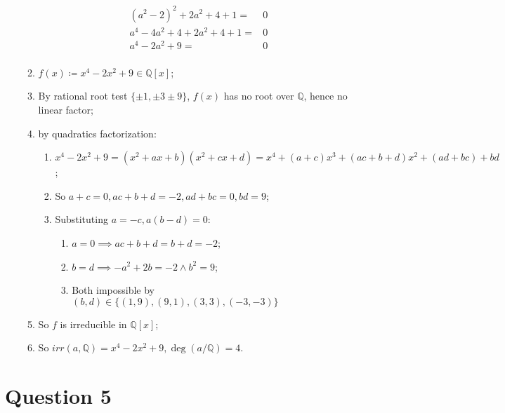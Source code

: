 \documentclass[11pt]{article}
\newcommand{\QQ}{\mathbb{Q}}
\begin{document}
\begin{enumerate}
\begin{enumerate}
\begin{align*}
            (a^2-2)^2+2a^2+4+1=&0\\
            a^4-4a^2+4+2a^2+4+1=&0\\
            a^4-2a^2+9=&0\\
        \end{align*}
        \item $f(x)\coloneqq x^4-2x^2+9\in\QQ[x]$;
        \item By rational root test $\{\pm 1,\pm3\pm9\}$, $f(x)$ has no root over $\QQ$, hence no linear factor;
        \item by quadratics factorization:
        \begin{enumerate}
            \item $x^4-2x^2+9=(x^2+ax+b)(x^2+cx+d)=x^4+(a+c)x^3+(ac+b+d)x^2+(ad+bc)+bd$;
            \item So $a+c=0,ac+b+d=-2,ad+bc=0,bd=9$;
            \item Substituting $a=-c, a(b-d)=0$:
            \begin{enumerate}
                \item $a=0\implies ac+b+d=b+d=-2$;
                \item $b=d\implies -a^2+2b=-2\land b^2=9$;
                \item Both impossible by $(b,d)\in\{(1,9),(9,1),(3,3),(-3,-3)\}$
            \end{enumerate}
        \end{enumerate}
        \item So $f$ is irreducible in $\QQ[x]$;
        \item So $irr(a,\QQ)=x^4-2x^2+9,\deg (a/\QQ)=4$.
    \end{enumerate}
\end{enumerate}

\newpage

\section*{Question 5}
\end{document}
